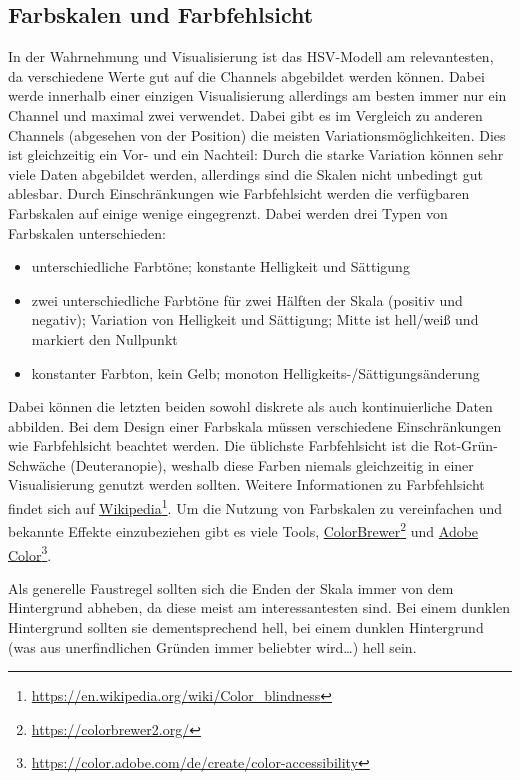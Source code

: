 		\subsection{Farbskalen und Farbfehlsicht}
			In der Wahrnehmung und Visualisierung ist das HSV-Modell am relevantesten, da verschiedene Werte gut auf die Channels abgebildet werden können. Dabei werde innerhalb einer einzigen Visualisierung allerdings am besten immer nur ein Channel und maximal zwei verwendet. Dabei gibt es im Vergleich zu anderen Channels (abgesehen von der Position) die meisten Variationsmöglichkeiten. Dies ist gleichzeitig ein Vor- und ein Nachteil: Durch die starke Variation können sehr viele Daten abgebildet werden, allerdings sind die Skalen nicht unbedingt gut ablesbar. Durch Einschränkungen wie Farbfehlsicht werden die verfügbaren Farbskalen auf einige wenige eingegrenzt. Dabei werden drei Typen von Farbskalen unterschieden:
			\begin{itemize}
				\item {} unterschiedliche Farbtöne; konstante Helligkeit und Sättigung
				\item {}   zwei unterschiedliche Farbtöne für zwei Hälften der Skala (\bspw positiv und negativ); Variation von Helligkeit und Sättigung; Mitte ist hell/weiß und markiert den Nullpunkt
				\item {} konstanter Farbton, kein Gelb; monoton Helligkeits-/Sättigungsänderung
			\end{itemize}
			Dabei können die letzten beiden sowohl diskrete als auch kontinuierliche Daten abbilden. Bei dem Design einer Farbskala müssen verschiedene Einschränkungen wie Farbfehlsicht beachtet werden. Die üblichste Farbfehlsicht ist die Rot-Grün-Schwäche (Deuteranopie), weshalb diese Farben niemals gleichzeitig in einer Visualisierung genutzt werden sollten. Weitere Informationen zu Farbfehlsicht findet sich auf \href{https://en.wikipedia.org/wiki/Color_blindness}{Wikipedia}\footnote{\url{https://en.wikipedia.org/wiki/Color_blindness}}. Um die Nutzung von Farbskalen zu vereinfachen und bekannte Effekte einzubeziehen gibt es viele Tools, \bspw \href{https://colorbrewer2.org}{ColorBrewer}\footnote{\url{https://colorbrewer2.org/}} und \href{https://color.adobe.com/de/create/color-accessibility}{Adobe Color}\footnote{\url{https://color.adobe.com/de/create/color-accessibility}}.

			Als generelle Faustregel sollten sich die Enden der Skala immer von dem Hintergrund abheben, da diese meist am interessantesten sind. Bei einem dunklen Hintergrund sollten sie dementsprechend hell, bei einem dunklen Hintergrund (was aus unerfindlichen Gründen immer beliebter wird\dots) hell sein.

